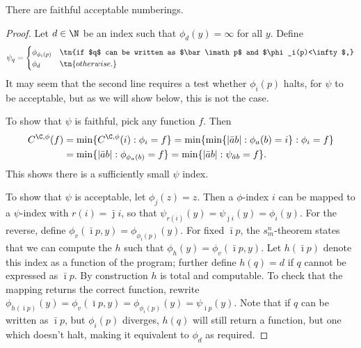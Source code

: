 \begin{lemma}\label{lemma:faithful-numberings}
  There are faithful acceptable numberings.
\end{lemma}

\begin{proof}
Let $d \in \N$ be an index such that $\phi_d(y)=\infty$ for all $y$. Define
  \[\psi_q=\begin{cases}
    \phi_{\phi_i(p)}&\tn{if $q$ can be written as $\bar\imath p$ and $\phi_i(p)<\infty$,}\\
    \phi_d&\tn{otherwise.}\end{cases}
  \]
It may seem that the second line requires a test whether $\phi_i(p)$ halts, for $\psi$ to be acceptable, but as we will show below, this is not the case.  
  
To show that $\psi$ is faithful, pick any function $f$. Then
\[\begin{split}
C^{\C, \phi}(f)&=\min\{C^{\C, \phi}(i):\phi_i=f\} =\min\{\min\{|\bar a b|:\phi_a(b)=i\}:\phi_i=f\} \\
& =\min\{|\bar a b|:\phi_{\phi_a(b)}=f\}
 =\min\{|\bar a b|:\psi_{\bar a b}=f\}.
\end{split}\]
This shows there is a sufficiently small $\psi$ index.

To show that $\psi$ is acceptable, let $\phi_j(z)=z$. Then a $\phi$-index $i$ can be mapped to a $\psi$-index
with $r(i)=\bar\jmath i$, so that
$\psi_{r(i)}(y)=\psi_{\bar\jmath i}(y)=\phi_i(y)$. For the reverse,
define $\phi_v(\bar\imath p, y)=\phi_{\phi_i(p)}(y)$. For fixed
$\bar\imath p$, the 
$s^n_m$-theorem \cite{kleene193notation} states that we can compute the $h$
such that $\phi_h(y)=\phi_v(\bar\imath p,y)$. Let $h(\bar\imath p)$
denote this index as a function of the program; further define
$h(q)=d$ if $q$ cannot be expressed as $\bar\imath p$. By
construction $h$ is total and computable. To check that the mapping
returns the correct function, rewrite $\phi_{h(\bar\imath
  p)}(y)=\phi_v(\bar\imath p,y)=\phi_{\phi_i(p)}(y)=\psi_{\bar\imath p}(y)$.
Note that if $q$ can be written as $\bar \imath p$, but $\phi_i(p)$ diverges, $h(q)$ will still return a function, but one which doesn't halt, making it equivalent to $\phi_d$ as required. 
\end{proof}